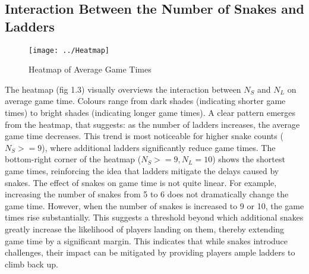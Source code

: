 \documentclass[12pt]{report}
\begin{document}
	\subsection{Interaction Between the Number of Snakes and Ladders}
		\begin{figure}[h]
			\centering
			\texttt{[image: ../Heatmap]}
			\caption{Heatmap of Average Game Times}
			\label{fig:Heatmap}
		\end{figure} 
	The heatmap (fig 1.3) visually overviews the interaction between $N_{S}$ and $N_{L}$ on average game time. Colours range from dark shades (indicating shorter game times) to bright shades (indicating longer game times). A clear pattern emerges from the heatmap, that suggests: as the number of ladders increases, the average game time decreases. This trend is most noticeable for higher snake counts ($N_{S} >= 9$), where additional ladders significantly reduce game times. The bottom-right corner of the heatmap ($N_{S} >= 9, N_{L} = 10$) shows the shortest game times, reinforcing the idea that ladders mitigate the delays caused by snakes. The effect of snakes on game time is not quite linear. For example, increasing the number of snakes from 5 to 6 does not dramatically change the game time. However, when the number of snakes is increased to 9 or 10, the game times rise substantially. This suggests a threshold beyond which additional snakes greatly increase the likelihood of players landing on them, thereby extending game time by a significant margin. This indicates that while snakes introduce challenges, their impact can be mitigated by providing players ample ladders to climb back up.
	
\end{document}

